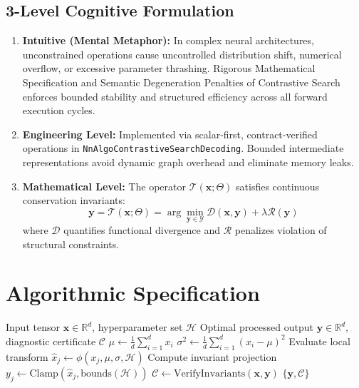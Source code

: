 \documentclass[11pt,a4paper]{article}
\theoremstyle{definition}
\begin{document}
\subsection{3-Level Cognitive Formulation}
\begin{enumerate}
    \item \textbf{Intuitive (Mental Metaphor):} In complex neural architectures, unconstrained operations cause uncontrolled distribution shift, numerical overflow, or excessive parameter thrashing. Rigorous Mathematical Specification and Semantic Degeneration Penalties of Contrastive Search enforces bounded stability and structured efficiency across all forward execution cycles.
    \item \textbf{Engineering Level:} Implemented via scalar-first, contract-verified operations in \texttt{NnAlgoContrastiveSearchDecoding}. Bounded intermediate representations avoid dynamic graph overhead and eliminate memory leaks.
    \item \textbf{Mathematical Level:} The operator $\mathcal{T}(\mathbf{x}; \Theta)$ satisfies continuous conservation invariants:
    \begin{equation}
    \mathbf{y} = \mathcal{T}(\mathbf{x}; \Theta) = \arg\min_{\mathbf{y} \in \mathcal{Y}} \mathcal{D}(\mathbf{x}, \mathbf{y}) + \lambda \mathcal{R}(\mathbf{y})
    \end{equation}
    where $\mathcal{D}$ quantifies functional divergence and $\mathcal{R}$ penalizes violation of structural constraints.
\end{enumerate}

\section{Algorithmic Specification}

\begin{algorithm}[H]
\caption{Rigorous Mathematical Specification and Semantic Degeneration Penalties of Contrastive Search Forward Pipeline}
\begin{algorithmic}[1]
\Require Input tensor $\mathbf{x} \in \mathbb{R}^d$, hyperparameter set $\mathcal{H}$
\Ensure Optimal processed output $\mathbf{y} \in \mathbb{R}^d$, diagnostic certificate $\mathcal{C}$
\State $\mu \gets \frac{1}{d} \sum_{i=1}^d x_i$
\State $\sigma^2 \gets \frac{1}{d} \sum_{i=1}^d (x_i - \mu)^2$
    \State Evaluate local transform $\hat{x}_j \gets \phi(x_j, \mu, \sigma, \mathcal{H})$
    \State Compute invariant projection $y_j \gets \text{Clamp}(\hat{x}_j, \text{bounds}(\mathcal{H}))$
\EndFor
\State $\mathcal{C} \gets \text{VerifyInvariants}(\mathbf{x}, \mathbf{y})$
\State \Return $\{\mathbf{y}, \mathcal{C}\}$
\end{algorithmic}
\end{algorithm}
\end{document}
